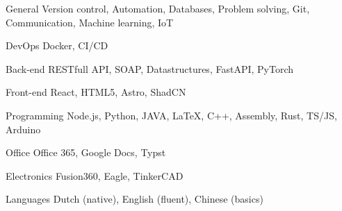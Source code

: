 

\begin{cvskills}

    \cvskill
    {General} %
    {Version control, Automation, Databases, Problem solving, Git, Communication, Machine learning, IoT} %

    \cvskill
    {DevOps} %
    {Docker, CI/CD} %

    \cvskill
    {Back-end} %
    {RESTfull API, SOAP, Datastructures, FastAPI, PyTorch} %

    \cvskill
    {Front-end} %
    {React, HTML5, Astro, ShadCN} %

    \cvskill
    {Programming} %
    {Node.js, Python, JAVA, LaTeX, C++, Assembly, Rust, TS/JS, Arduino} %

    \cvskill
    {Office} %
    {Office 365, Google Docs, Typst} %

    \cvskill
    {Electronics} %
    {Fusion360, Eagle, TinkerCAD} %

    \cvskill
    {Languages} %
    {Dutch (native), English (fluent), Chinese (basics)} %
\end{cvskills}
